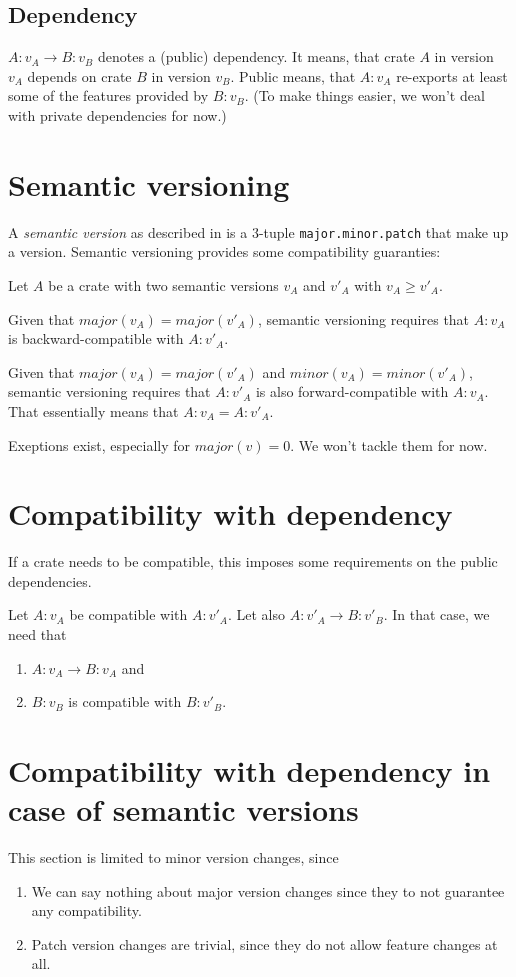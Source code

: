 \documentclass{article}
\begin{document}
    \subsection{Dependency}
    $A:v_A \rightarrow B:v_B$ denotes a (public) dependency. It means, that crate $A$ in version $v_A$ depends on crate $B$ in version $v_B$. Public means, that $A:v_A$ re-exports at least some of the features provided by $B:v_B$. (To make things easier, we won't deal with private dependencies for now.)

    \section{Semantic versioning}
    A \emph{semantic version} as described in \cite{semver} is a 3-tuple \texttt{major.minor.patch} that make up a version. Semantic versioning provides some compatibility guaranties:

    Let $A$ be a crate with two semantic versions $v_A$ and $v'_A$ with $v_A \geq v'_A$.

    Given that $major(v_A) = major(v'_A)$, semantic versioning requires that $A:v_A$ is backward-compatible with $A:v'_A$.

    Given that $major(v_A) = major(v'_A)$ and $minor(v_A) = minor(v'_A)$, semantic versioning requires that $A:v'_A$ is also forward-compatible with $A:v_A$. That essentially means that $A:v_A = A:v'_A$.

    Exeptions exist, especially for $major(v) = 0$. We won't tackle them for now.

    \section{Compatibility with dependency}
    If a crate needs to be compatible, this imposes some requirements on the public dependencies.

    Let $A:v_A$ be compatible with $A:v'_A$. Let also $A:v'_A \rightarrow B:v'_B$. In that case, we need that
    \begin{enumerate}
        \item $A:v_A \rightarrow B:v_A$ and
        \item $B:v_B$ is compatible with $B:v'_B$.
    \end{enumerate}

    \section{Compatibility with dependency in case of semantic versions}
    \label{sec:Compatibility_with_dependency_in_case_of_semantic_versions}
    This section is limited to minor version changes, since
    \begin{enumerate}
        \item We can say nothing about major version changes since they to not guarantee any compatibility.
        \item Patch version changes are trivial, since they do not allow feature changes at all.
    \end{enumerate}
\end{document}
